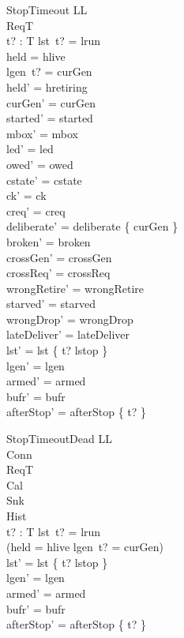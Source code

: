 \documentclass[a4paper,10pt,fleqn]{article}
\begin{document}
\begin{schema}{StopTimeout}
  \Delta LL \\
  \Xi ReqT \\
  t? : T
\where
  lst~t? = lrun \\
  held = hlive \\
  lgen~t? = curGen \\
  held' = hretiring \\
  curGen' = curGen \\
  started' = started \\
  mbox' = mbox \\
  led' = led \\
  owed' = owed \\
  cstate' = cstate \\
  ck' = ck \\
  creq' = creq \\
  deliberate' = deliberate \cup \{ curGen \} \\
  broken' = broken \\
  crossGen' = crossGen \\
  crossReq' = crossReq \\
  wrongRetire' = wrongRetire \\
  starved' = starved \\
  wrongDrop' = wrongDrop \\
  lateDeliver' = lateDeliver \\
  lst' = lst \oplus \{ t? \mapsto lstop \} \\
  lgen' = lgen \\
  armed' = armed \\
  bufr' = bufr \\
  afterStop' = afterStop \oplus \{ t?  \}
\end{schema}

\begin{schema}{StopTimeoutDead}
  \Delta LL \\
  \Xi Conn \\
  \Xi ReqT \\
  \Xi Cal \\
  \Xi Snk \\
  \Xi Hist \\
  t? : T
\where
  lst~t? = lrun \\
  \lnot (held = hlive \land lgen~t? = curGen) \\
  lst' = lst \oplus \{ t? \mapsto lstop \} \\
  lgen' = lgen \\
  armed' = armed \\
  bufr' = bufr \\
  afterStop' = afterStop \oplus \{ t?  \}
\end{schema}
\end{document}
